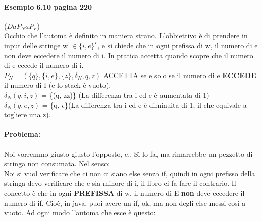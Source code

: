 \documentclass[12pt, a4paper, openany, oneside]{book}
\begin{document}
\paragraph{Esempio 6.10 pagina 220} ($Da P_{N} a P_{F}$)\\
Occhio che l'automa è definito in maniera strano. L'obbiettivo è di prendere in 
input delle stringe w $\in \{i, e\}^{\star}$, e si chiede che in ogni prefissa di 
w, il numero di e non deve eccedere il numero di i. In pratica accetta quando
scopre che il numero di e eccede il numero di i. \\
$P_{N} = (\{q\}, \{i, e\}, \{z\}, \delta_{N}, q, z)$ ACCETTA se e solo se il numero
di e \textbf{ECCEDE} il numero di I (e lo stack è vuoto).\\
$\delta_{N}(q, i, z)$ = \{(q, zz)\} (La differenza tra i ed e è aumentata di 1)\\
$\delta_{N}(q, e, z)$ = \{q, $\epsilon$\}(La differenza tra i ed e è diminuita di 1, il che equivale
a togliere una z).
\paragraph{Problema: }Noi vorremmo giusto giusto l'opposto, e.. Sì lo fa, ma 
rimarrebbe un pezzetto di stringa non consumata. Nel senso:\\
Noi si vuol verificare che ci non ci siano else senza if, quindi in ogni prefisso
della stringa devo verificare che e sia minore di i, il libro ci fa fare il 
contrario. Il concetto è che in ogni \textbf{PREFISSA} di w, il numero di E \textbf{non}
deve eccedere il numero di if. Cioè, in java, puoi avere un if, ok, ma non degli else
messi così a vuoto.
Ad ogni modo l'automa che esce è questo:
\begin{center}
\end{center}
\end{document}
